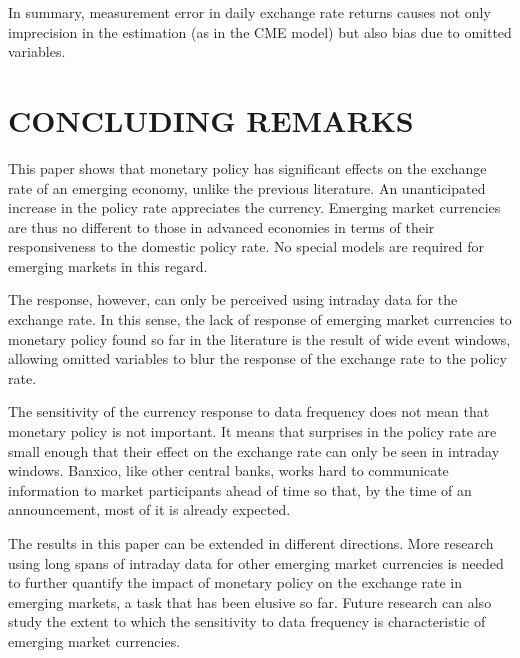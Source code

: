 \documentclass[a4paper,12pt]{article} 		%
\newcommand{\sectitlespace}{\vspace{0.1in}}
\begin{document}
In summary, measurement error in daily exchange rate returns causes not only imprecision in the estimation (as in the CME model) but also bias due to omitted variables. 

\sectitlespace
\section{CONCLUDING REMARKS}\label{sec:conclusions}
\sectitlespace

This paper shows that monetary policy has significant effects on the exchange rate of an emerging economy, unlike the previous literature. An unanticipated increase in the policy rate appreciates the currency. Emerging market currencies are thus no different to those in advanced economies in terms of their responsiveness to the domestic policy rate. No special models are required for emerging markets in this regard. 

The response, however, can only be perceived using intraday data for the exchange rate. 
In this sense, the lack of response of emerging market currencies to monetary policy found so far in the literature is the result of wide event windows, allowing omitted variables to blur the response of the exchange rate to the policy rate. 

The sensitivity of the currency response to data frequency does not mean that monetary policy is not important. It means that surprises in the policy rate are small enough that their effect on the exchange rate can only be seen in intraday windows. Banxico, like other central banks, works hard to communicate information to market participants ahead of time so that, by the time of an announcement, most of it is already expected. 

The results in this paper can be extended in different directions. More research using long spans of intraday data for other emerging market currencies is needed to further quantify the impact of monetary policy on the exchange rate in emerging markets, a task that has been elusive so far. Future research can also study the extent to which the sensitivity to data frequency is characteristic of emerging market currencies. 
\end{document}
